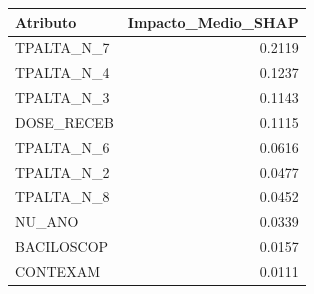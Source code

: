 \begin{tabular}{lr}
\toprule
Atributo & Impacto\_Medio\_SHAP \\
\midrule
TPALTA\_N\_7 & 0.2119 \\
TPALTA\_N\_4 & 0.1237 \\
TPALTA\_N\_3 & 0.1143 \\
DOSE\_RECEB & 0.1115 \\
TPALTA\_N\_6 & 0.0616 \\
TPALTA\_N\_2 & 0.0477 \\
TPALTA\_N\_8 & 0.0452 \\
NU\_ANO & 0.0339 \\
BACILOSCOP & 0.0157 \\
CONTEXAM & 0.0111 \\
\bottomrule
\end{tabular}

